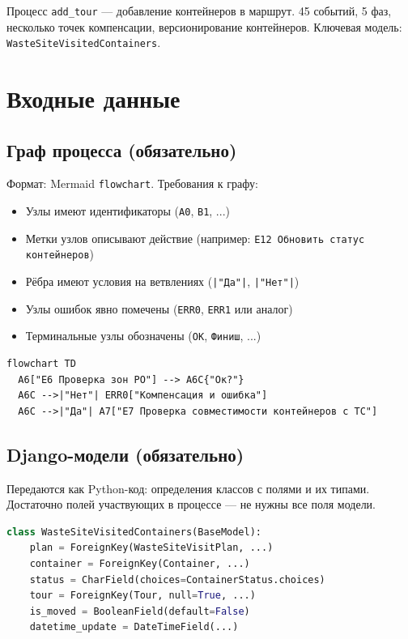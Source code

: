 \documentclass[11pt, a4paper, oneside]{article}
\begin{document}
Процесс \texttt{add\_tour} — добавление контейнеров в маршрут.
45 событий, 5 фаз, несколько точек компенсации, версионирование
контейнеров. Ключевая модель: \texttt{WasteSiteVisitedContainers}.

\section{Входные данные}

\subsection{Граф процесса (обязательно)}

Формат: Mermaid \texttt{flowchart}. Требования к графу:

\begin{itemize}
  \item Узлы имеют идентификаторы (\texttt{A0}, \texttt{B1}, ...)
  \item Метки узлов описывают действие (например: \texttt{E12 Обновить статус контейнеров})
  \item Рёбра имеют условия на ветвлениях (\texttt{|"Да"|}, \texttt{|"Нет"|})
  \item Узлы ошибок явно помечены (\texttt{ERR0}, \texttt{ERR1} или аналог)
  \item Терминальные узлы обозначены (\texttt{OK}, \texttt{Финиш}, ...)
\end{itemize}

\begin{lstlisting}[language={}, caption={Пример входного графа (фрагмент)}]
flowchart TD
  A6["E6 Проверка зон РО"] --> A6C{"Ок?"}
  A6C -->|"Нет"| ERR0["Компенсация и ошибка"]
  A6C -->|"Да"| A7["E7 Проверка совместимости контейнеров с ТС"]
\end{lstlisting}

\subsection{Django-модели (обязательно)}

Передаются как Python-код: определения классов с полями и их типами.
Достаточно полей участвующих в процессе — не нужны все поля модели.

\begin{lstlisting}[language=Python, caption={Пример входной модели (фрагмент)}]
class WasteSiteVisitedContainers(BaseModel):
    plan = ForeignKey(WasteSiteVisitPlan, ...)
    container = ForeignKey(Container, ...)
    status = CharField(choices=ContainerStatus.choices)
    tour = ForeignKey(Tour, null=True, ...)
    is_moved = BooleanField(default=False)
    datetime_update = DateTimeField(...)
\end{lstlisting}
\end{document}
